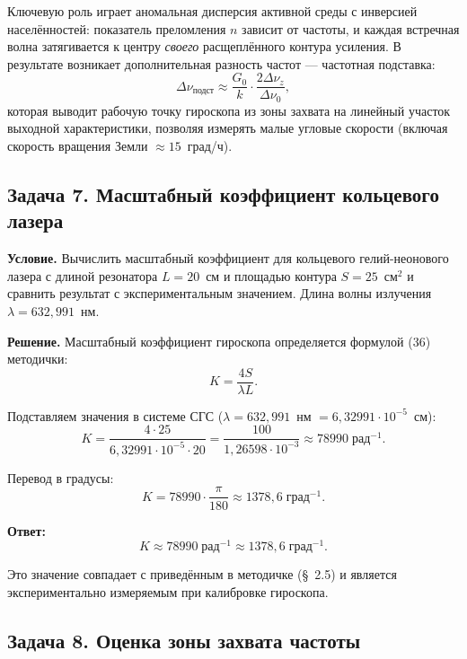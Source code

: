 \documentclass[12pt, a4paper]{article}
\begin{document}
Ключевую роль играет аномальная дисперсия активной среды с инверсией населённостей: показатель преломления $n$ зависит от частоты, и каждая встречная волна затягивается к центру \textit{своего} расщеплённого контура усиления. В результате возникает дополнительная разность частот --- частотная подставка:
\begin{equation}
    \Delta \nu_{\text{подст}} \approx \frac{G_0}{k} \cdot \frac{2 \Delta \nu_z}{\Delta \nu_0},
\end{equation}
которая выводит рабочую точку гироскопа из зоны захвата на линейный участок выходной характеристики, позволяя измерять малые угловые скорости (включая скорость вращения Земли $\approx 15$~град/ч).


\subsection*{Задача 7. Масштабный коэффициент кольцевого лазера}

\textbf{Условие.} Вычислить масштабный коэффициент для кольцевого гелий-неонового лазера с длиной резонатора $L = 20$~см и площадью контура $S = 25$~см$^2$ и сравнить результат с экспериментальным значением. Длина волны излучения $\lambda = 632{,}991$~нм.

\textbf{Решение.} Масштабный коэффициент гироскопа определяется формулой (36) методички:
\begin{equation}
    K = \frac{4S}{\lambda L}.
\end{equation}

Подставляем значения в системе СГС ($\lambda = 632{,}991$~нм $= 6{,}32991 \cdot 10^{-5}$~см):
\begin{equation}
    K = \frac{4 \cdot 25}{6{,}32991 \cdot 10^{-5} \cdot 20} = \frac{100}{1{,}26598 \cdot 10^{-3}} \approx 78990 \; \text{рад}^{-1}.
\end{equation}

Перевод в градусы:
\begin{equation}
    K = 78990 \cdot \frac{\pi}{180} \approx 1378{,}6 \; \text{град}^{-1}.
\end{equation}

\textbf{Ответ:}
\[
    \boxed{K \approx 78990 \; \text{рад}^{-1} \approx 1378{,}6 \; \text{град}^{-1}.}
\]

Это значение совпадает с приведённым в методичке (§~2.5) и является экспериментально измеряемым при калибровке гироскопа.


\subsection*{Задача 8. Оценка зоны захвата частоты}
\end{document}
